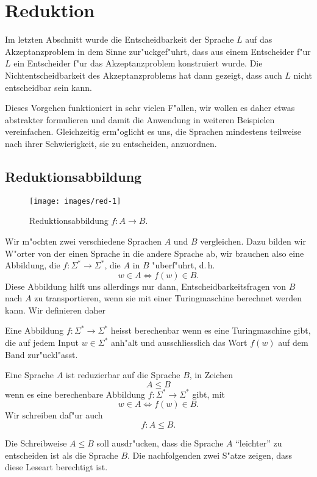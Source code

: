 \section{Reduktion}
%
Im letzten Abschnitt wurde die Entscheidbarkeit der Sprache $L$
auf das Akzeptanzproblem in dem Sinne zur"uckgef"uhrt, dass
aus einem Entscheider f"ur $L$ ein Entscheider f"ur das Akzeptanzproblem
konstruiert wurde.
Die Nichtentscheidbarkeit des Akzeptanzproblems
hat dann gezeigt, dass auch $L$ nicht entscheidbar sein kann.

Dieses Vorgehen funktioniert in sehr vielen F"allen, wir wollen es
daher etwas abstrakter formulieren und damit die Anwendung in weiteren
Beispielen vereinfachen.
Gleichzeitig erm"oglicht es uns, die
Sprachen mindestens teilweise nach ihrer Schwierigkeit, sie zu entscheiden,
anzuordnen.

\subsection{Reduktionsabbildung}
%
\begin{figure}
\begin{center}
\texttt{[image: images/red-1]}
\end{center}
\caption{Reduktionsabbildung $f\colon A\to B$.\label{reduktionsabbildung}}
\end{figure}
Wir m"ochten zwei verschiedene Sprachen 
$A$ und $B$ 
vergleichen.
Dazu bilden wir W"orter von der einen Sprache in
die andere Sprache ab, wir brauchen also eine Abbildung, die
$f\colon\Sigma^*\to \Sigma^*$, die $A$ in $B$ "uberf"uhrt,
d.\,h.
\[
w\in A\Leftrightarrow f(w)\in B.
\]
Diese Abbildung hilft uns allerdings nur dann, Entscheidbarkeitsfragen
von $B$ nach $A$ zu transportieren, wenn sie mit einer Turingmaschine
berechnet werden kann.
Wir definieren daher

\begin{definition}
%
Eine Abbildung $f\colon \Sigma^*\to \Sigma^*$ heisst berechenbar wenn es eine
Turingmaschine gibt, die auf jedem Input $w\in \Sigma^*$ anh"alt
und ausschliesslich das Wort $f(w)$ auf dem Band zur"uckl"asst.
\end{definition}

\begin{definition}
%
Eine Sprache $A$ ist reduzierbar auf die Sprache $B$, in Zeichen
\[
A\le B
\]
wenn es eine
berechenbare Abbildung $f\colon \Sigma^*\to \Sigma^*$ gibt, mit
\[
w\in A\Leftrightarrow f(w)\in B.
\]
Wir schreiben daf"ur auch
\[
f\colon A\le B.
\]
\end{definition}
Die Schreibweise $A\le B$ soll ausdr"ucken, dass die Sprache $A$ ``leichter''
zu entscheiden ist als die Sprache $B$.
Die nachfolgenden zwei S"atze
zeigen, dass diese Leseart berechtigt ist.

